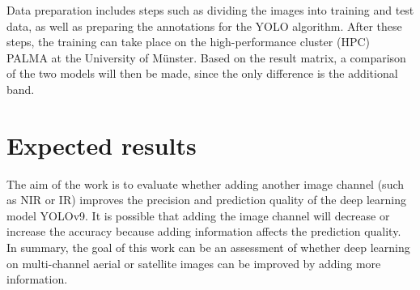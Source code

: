 \documentclass[a4paper,11pt,pdftex, parskip]{scrreprt}
\begin{document}
Data preparation includes steps such as dividing the images into training and test data, as well as preparing the annotations for the YOLO algorithm. After these steps, the training can take place on the high-performance cluster (HPC) PALMA at the University of Münster. Based on the result matrix, a comparison of the two models will then be made, since the only difference is the additional band. 

\section*{Expected results}

The aim of the work is to evaluate whether adding another image channel (such as NIR or IR) improves the precision and prediction quality of the deep learning model YOLOv9. It is possible that adding the image channel will decrease or increase the accuracy because adding information affects the prediction quality. \\
In summary, the goal of this work can be an assessment of whether deep learning on multi-channel aerial or satellite images can be improved by adding more information.





\appendix



\end{document}

